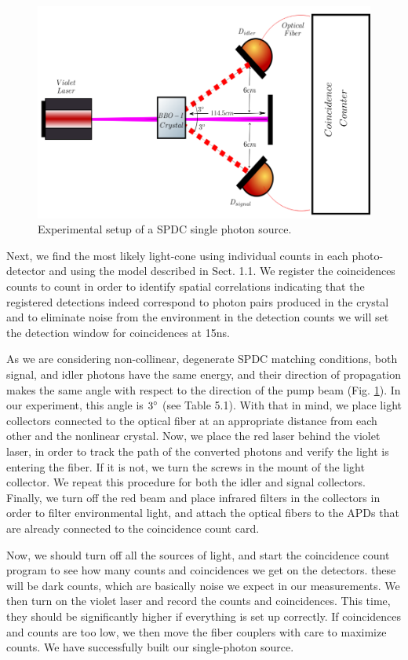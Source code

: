 \documentclass[12pt]{book}
\begin{document}
\begin{figure}[t!]
\centering
\includegraphics[scale=0.3]{images/sPDC.png}
\caption{Experimental setup of a SPDC single photon source.}
\label{single}
\end{figure}

Next, we find the most likely light-cone using individual counts in each photo-detector and using the model described in Sect. 1.1. We register the coincidences counts to count in order to identify spatial correlations indicating that the registered detections indeed correspond to photon pairs produced in the crystal and to eliminate noise from the environment in the detection counts we will set the detection window for coincidences at 15ns.

 As we are considering non-collinear, degenerate SPDC matching conditions, both signal, and idler photons have the same energy, and their direction of propagation makes the same angle with respect to the direction of the pump beam (Fig. \ref{single}). In our experiment, this angle is $3\degree$ (see Table 5.1). With that in mind, we place light collectors connected to the optical fiber at an appropriate distance from each other and the nonlinear crystal. Now, we place the red laser behind the violet laser, in order to track the path of the converted photons and verify the light is entering the fiber. If it is not, we turn the screws in the mount of the light collector. We repeat this procedure for both the idler and signal collectors. Finally, we turn off the red beam and place infrared filters in the collectors in order to filter environmental light, and attach the optical fibers to the APDs that are already connected to the coincidence count card.

Now, we should turn off all the sources of light, and start the coincidence count program to see how many counts and coincidences we get on the detectors. these will be dark counts, which are basically noise we expect in our measurements. We then turn on the violet laser and record the counts and coincidences. This time, they should be significantly higher if everything is set up correctly. If coincidences and counts are too low, we then move the fiber couplers with care to maximize counts. We have successfully built our single-photon source.
\end{document}
